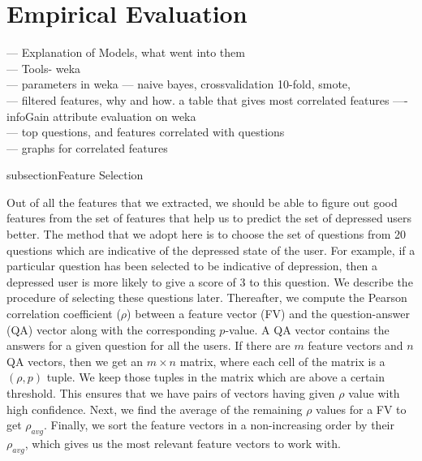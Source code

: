 
\section{Empirical Evaluation}
\label{sec:experiments}

--- Explanation of Models, what went into them\\
--- Tools- weka \\
--- parameters in weka --- naive bayes, crossvalidation 10-fold, smote, \\
--- filtered features, why and how. a table that gives most correlated features ---- infoGain attribute evaluation on weka\\
--- top questions, and features correlated with questions\\
--- graphs for correlated features

subsection{Feature Selection}

Out of all the features that we extracted, we should be able to figure out good features from the set of features that help us to predict the set of depressed users better. The method that we adopt here is to choose the set of questions from 20 questions which are indicative of the depressed state of the user. For example, if a particular question has been selected to be indicative of depression, then a depressed user is more likely to give a score of 3 to this question. We describe the procedure of selecting these questions later. Thereafter, we compute the Pearson correlation coefficient ($\rho$) between a feature vector (FV) and the question-answer (QA) vector along with the corresponding $p$-value. A QA vector contains the answers for a given question for all the users. If there are $m$ feature vectors and $n$ QA vectors, then we get an $m\times n$ matrix, where each cell of the matrix is a $(\rho, p)$ tuple. We keep those tuples in the matrix which are above a certain threshold. This ensures that we have pairs of vectors having given $\rho$ value with high confidence. Next, we find the average of the remaining $\rho$ values for a FV to get $\rho_{avg}$. Finally, we sort the feature vectors in a non-increasing order by their $\rho_{avg}$, which gives us the most relevant feature vectors to work with.

